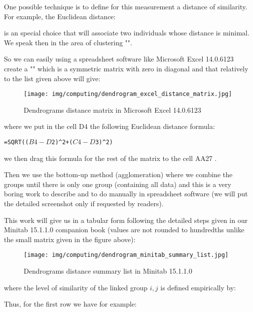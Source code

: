 	One possible technique is to define for this measurement a distance of similarity. For example, the Euclidean distance:
	
	is an special choice that will associate two individuals whose distance is minimal. We speak then in the area of clustering "".

	So we can easily using a spreadsheet software like Microsoft Excel 14.0.6123 create a "" which is a symmetric matrix with zero in diagonal and that relatively to the list given above will give:
	\begin{figure}[H]
		\centering
		\texttt{[image: img/computing/dendrogram\_excel\_distance\_matrix.jpg]}
		\caption[]{Dendrograms distance matrix in Microsoft Excel 14.0.6123}
	\end{figure}
	where we put in the cell D4 the following Euclidean distance formula:
	\begin{center}
		\texttt{=SQRT(($B4-D$2)\string^2+($C4-D$3)\string^2)}
	\end{center}
	we then drag this formula for the rest of the matrix to the cell AA27 .

	Then we use the bottom-up method (agglomeration) where we combine the groups until there is only one group (containing all data) and this is a very boring work to describe and to do manually in spreadsheet software (we will put the detailed screenshot only if requested by readers).

	This work will give us in a tabular form following the detailed steps given in our Minitab 15.1.1.0 companion book (values are not rounded to hundredths unlike the small matrix given in the figure above):
	\begin{figure}[H]
		\centering
		\texttt{[image: img/computing/dendrogram\_minitab\_summary\_list.jpg]}
		\caption[]{Dendrograms distance summary list in Minitab 15.1.1.0}
	\end{figure}
	where the level of similarity of the linked group $i,j$ is defined empirically by:
	
	Thus, for the first row we have for example:
	
